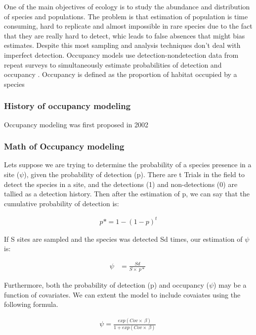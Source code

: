 \documentclass[article]{jss}
\begin{document}
One of the main objectives of ecology is to study the abundance and
distribution of species and populations. The problem is that estimation
of population is time consuming, hard to replicate and almost impossible
in rare species due to the fact that they are really hard to detect,
whic leads to false absences that might bias estimates. Despite this
most sampling and analysis techniques don't deal with imperfect
detection. Occupancy models use detection-nondetection data from repeat
surveys to simultaneously estimate probabilities of detection and
occupancy \citep{kellner2014accounting}. Occupancy is defined as the
proportion of habitat occupied by a species
\citep{mackenzie_estimating_2002}

\subsubsection{History of occupancy
modeling}\label{history-of-occupancy-modeling}

Occupancy modeling was first proposed in 2002
\citep{mackenzie_estimating_2002}

\subsubsection{Math of Occupancy
modeling}\label{math-of-occupancy-modeling}

Lets suppose we are trying to determine the probability of a species
presence in a site (\(\psi\)), given the probability of detection (p).
There are t Trials in the field to detect the species in a site, and the
detections (1) and non-detections (0) are tallied as a detection
history. Then after the estimation of p, we can say that the cumulative
probability of detection is:

\[
\begin{aligned}
  \ p* = 1 -  \left( 1 - p \right)^t \
\end{aligned}
\]

If S sites are sampled and the species was detected Sd times, our
estimation of \(\psi\) is:

\[
\begin{aligned}
  \psi & = \frac{Sd}{S \times\ p*} \
\end{aligned}
\]

Furthermore, both the probability of detection (p) and occupancy
(\(\psi\)) may be a function of covariates. We can extent the model to
include covaiates using the following formula.

\[
\begin{aligned}
  \psi = \frac{exp(Cov \times\ \beta)}{1 + exp(Cov \times\ \beta)} \
\end{aligned}
\]
\end{document}
